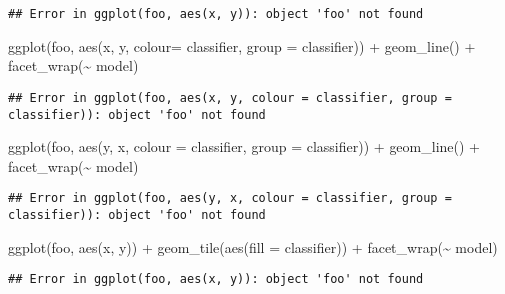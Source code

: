 \documentclass[
]{article}
\newenvironment{Shaded}{\begin{snugshade}}{\end{snugshade}}
\newcommand{\AttributeTok}[1]{\textcolor[rgb]{0.77,0.63,0.00}{#1}}
\newcommand{\FunctionTok}[1]{\textcolor[rgb]{0.00,0.00,0.00}{#1}}
\newcommand{\NormalTok}[1]{#1}
\newcommand{\SpecialCharTok}[1]{\textcolor[rgb]{0.00,0.00,0.00}{#1}}
\begin{document}
\begin{verbatim}
## Error in ggplot(foo, aes(x, y)): object 'foo' not found
\end{verbatim}

\begin{Shaded}
\begin{Highlighting}[]
\FunctionTok{ggplot}\NormalTok{(foo, }\FunctionTok{aes}\NormalTok{(x, y, }\AttributeTok{colour=}\NormalTok{ classifier, }\AttributeTok{group =}\NormalTok{ classifier)) }\SpecialCharTok{+} 
  \FunctionTok{geom\_line}\NormalTok{() }\SpecialCharTok{+}
  \FunctionTok{facet\_wrap}\NormalTok{(}\SpecialCharTok{\textasciitilde{}}\NormalTok{ model)}
\end{Highlighting}
\end{Shaded}

\begin{verbatim}
## Error in ggplot(foo, aes(x, y, colour = classifier, group = classifier)): object 'foo' not found
\end{verbatim}

\begin{Shaded}
\begin{Highlighting}[]
\FunctionTok{ggplot}\NormalTok{(foo, }\FunctionTok{aes}\NormalTok{(y, x, }\AttributeTok{colour =}\NormalTok{ classifier, }\AttributeTok{group =}\NormalTok{ classifier)) }\SpecialCharTok{+} 
  \FunctionTok{geom\_line}\NormalTok{() }\SpecialCharTok{+}
  \FunctionTok{facet\_wrap}\NormalTok{(}\SpecialCharTok{\textasciitilde{}}\NormalTok{ model)}
\end{Highlighting}
\end{Shaded}

\begin{verbatim}
## Error in ggplot(foo, aes(y, x, colour = classifier, group = classifier)): object 'foo' not found
\end{verbatim}

\begin{Shaded}
\begin{Highlighting}[]
\FunctionTok{ggplot}\NormalTok{(foo, }\FunctionTok{aes}\NormalTok{(x, y)) }\SpecialCharTok{+} 
  \FunctionTok{geom\_tile}\NormalTok{(}\FunctionTok{aes}\NormalTok{(}\AttributeTok{fill =}\NormalTok{ classifier)) }\SpecialCharTok{+} 
  \FunctionTok{facet\_wrap}\NormalTok{(}\SpecialCharTok{\textasciitilde{}}\NormalTok{ model)}
\end{Highlighting}
\end{Shaded}

\begin{verbatim}
## Error in ggplot(foo, aes(x, y)): object 'foo' not found
\end{verbatim}
\end{document}
